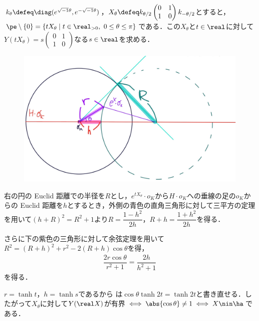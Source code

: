 \begin{npfwn}


  $k_{\theta} \defeq \diag(e^{\sqrt{-1}\theta},e^{-\sqrt{-1}\theta}) $，$X_{\theta} \defeq k_{\theta/2}
  \begin{pmatrix}
    0 & 1 \\ 1 & 0
  \end{pmatrix}
  k_{-\theta/2}$とすると，$\pe\setminus\{0\} =  \{tX_{\theta}\mid t\in \real_{>0},\ 0\leq \theta\leq \pi\}$である．この$X_{\theta} $と$t\in \real$に対して$Y(tX_{\theta} ) = s
  \begin{pmatrix}
    0 & 1 \\ 1 & 0
  \end{pmatrix}
  $なる$s\in \real $を求める．


  
  \begin{figure}[H]
    \centering
    \includegraphics[scale=0.08]{../graph/prob-eg-1.jpg}
    \caption{}
    \label{fig:prob-eg-1}
  \end{figure}

  右の円の Euclid 距離での半径を$R$とし，$e^{tX_{\theta}}\cdot o_K $から$H\cdot o_K$への垂線の足の$o_K$からの Euclid 距離を$h$とするとき，外側の青色の直角三角形に対して三平方の定理を用いて$(h+R)^2 = R^2 +  1 $より$R = \dfrac{1-h^2}{2h}$，$R+h = \dfrac{1+h^2}{2h}  $を得る．

  さらに下の紫色の三角形に対して余弦定理を用いて${R^2 = (R+h)^2 + r^2 - 2(R+h) \cos\theta }$を得，
  \begin{align}
    {\dfrac{2r\cos\theta}{r^2 + 1} = \dfrac{2h}{h^2 + 1} }\label{eq:1018-main}
  \end{align}
  を得る．

  $r = \tanh t$，$h = \tanh s$であるから は$\cos\theta \tanh 2t = \tanh 2t $と書き直せる．したがって$X_{\theta}$に対して$Y(\real X) $が有界$\iff \abs{\cos\theta}\neq 1 \iff  X\nin \ha  $である．
\end{npfwn}

